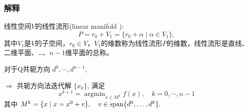 \documentclass{beamer}
\begin{document}
	\begin{frame}
		\frametitle{解释}
		
        \mytitle{\secno \secname}
		
			线性空间$V$的线性流形(linear manifold ): $$P=r_0+V_1=\{r_0+\alpha \mid \alpha \in V_1\},$$ 其中$V_1$是$V$的子空间，$r_0\in V$，$V_1$的维数称为线性流形$P$的维数，线性流形是直线、二维平面、\dots、$n-1$维平面的总称。
			
		
			对于Q共轭方向 $d^0,\cdots,d^{n-1}$,
			
			$\Rightarrow$  共轭方向法迭代解 $\{x_k\}$,
			满足      %
			\begin{equation}
				x^{k+1}=\mathop{\arg\min}_{x \in M^k}f(x), \quad k=0,\cdots, n-1
			\end{equation}
			其中
			$
			M^k=\{x \mid x=x^0+v\},\quad v\in \textnormal{span}\{ d^0,\dots,d^k\}.
			$
			
		
		
		
	\end{frame}
\end{document}
